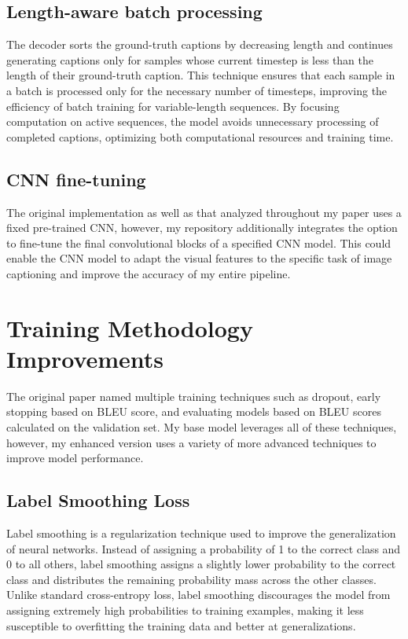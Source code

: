 \documentclass{article}
\theoremstyle{plain}
\theoremstyle{definition}
\theoremstyle{remark}
\begin{document}
\subsection{Length-aware batch processing} The decoder sorts the ground-truth captions by decreasing length and continues generating captions only for samples whose current timestep is less than the length of their ground-truth caption. This technique ensures that each sample in a batch is processed only for the necessary number of timesteps, improving the efficiency of batch training for variable-length sequences. By focusing computation on active sequences, the model avoids unnecessary processing of completed captions, optimizing both computational resources and training time.

\subsection{CNN fine-tuning} The original implementation as well as that analyzed throughout my paper uses a fixed pre-trained CNN, however, my repository additionally integrates the option to fine-tune the final convolutional blocks of a specified CNN model. This could enable the CNN model to adapt the visual features to the specific task of image captioning and improve the accuracy of my entire pipeline. 

\section{Training Methodology Improvements}

The original paper named multiple training techniques such as dropout, early stopping based on BLEU score, and evaluating models based on BLEU scores calculated on the validation set. My base model leverages all of these techniques, however, my enhanced version uses a variety of more advanced techniques to improve model performance.

\subsection{Label Smoothing Loss}

Label smoothing is a regularization technique used to improve the generalization of neural networks. Instead of assigning a probability of 1 to the correct class and 0 to all others, label smoothing assigns a slightly lower probability to the correct class and distributes the remaining probability mass across the other classes. Unlike standard cross-entropy loss, label smoothing discourages the model from assigning extremely high probabilities to training examples, making it less susceptible to overfitting the training data and better at generalizations.
\end{document}
